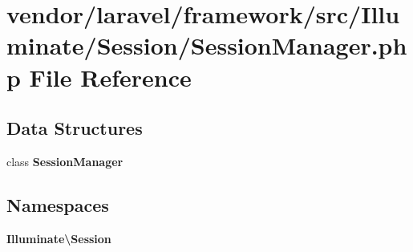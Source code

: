 \section{vendor/laravel/framework/src/\+Illuminate/\+Session/\+Session\+Manager.php File Reference}
\label{_session_manager_8php}
\subsection*{Data Structures}
\begin{DoxyCompactItemize}
\item 
class {\bf Session\+Manager}
\end{DoxyCompactItemize}
\subsection*{Namespaces}
\begin{DoxyCompactItemize}
\item 
 {\bf Illuminate\textbackslash{}\+Session}
\end{DoxyCompactItemize}
